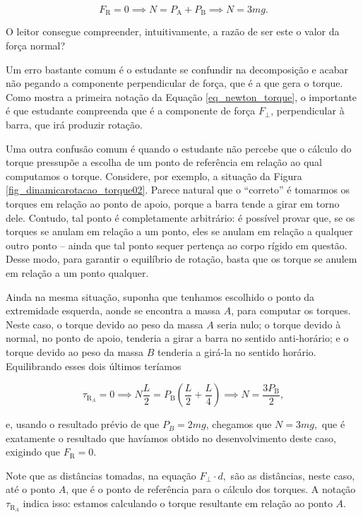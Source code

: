 $$ F_\text{R} = 0 \implies N = P_\text{A} + P_\text{B} \implies N = 3mg.$$

O leitor consegue compreender, intuitivamente, a razão de ser este o valor da força normal?



Um erro bastante comum é o estudante se confundir na decomposição e acabar não pegando a componente perpendicular de força, que é a que gera o torque. Como mostra a primeira notação da Equação \eqref{eq_newton_torque}, o importante é que estudante compreenda que é a componente de força $F_\perp$, perpendicular à barra, que irá produzir rotação.

Uma outra confusão comum é quando o estudante não percebe que o cálculo do torque pressupõe a escolha de um ponto de referência em relação ao qual computamos o torque. Considere, por exemplo, a situação da Figura \ref{fig_dinamicarotacao_torque02}. Parece natural que o ``correto'' é tomarmos os torques em relação ao ponto de apoio, porque a barra tende a girar em torno dele. Contudo, tal ponto é completamente arbitrário: é possível provar que, se os torques se anulam em relação a um ponto, eles se anulam em relação a qualquer outro ponto -- ainda que tal ponto sequer pertença ao corpo rígido em questão. Desse modo, para garantir o equilíbrio de rotação, basta que os torque se anulem em relação a um ponto qualquer.

Ainda na mesma situação, suponha que tenhamos escolhido o ponto da extremidade esquerda, aonde se encontra a massa $A$, para computar os torques. Neste caso, o torque devido ao peso da massa $A$ seria nulo; o torque devido à normal, no ponto de apoio, tenderia a girar a barra no sentido anti-horário; e o torque devido ao peso da massa $B$ tenderia a girá-la no sentido horário. Equilibrando esses dois últimos teríamos

$$ \tau_{\text{R}_{A}} = 0 \implies N \dfrac{L}{2} = P_\text{B} \left(\dfrac{L}{2} + \dfrac{L}{4}  \right)\implies N = \dfrac{3P_\text{B}}{2},$$

\noindent e, usando o resultado prévio de que $P_B=2mg$, chegamos que $N=3mg,$ que é exatamente o resultado que havíamos obtido no desenvolvimento deste caso, exigindo que $F_\text{R}=0.$

Note que as distâncias tomadas, na equação $F_\perp \cdot d,$ são as distâncias, neste caso, até o ponto $A$, que é o ponto de referência para o cálculo dos torques. A notação $\tau_{\text{R}_{A}} $ indica isso: estamos calculando o torque resultante em relação ao ponto $A.$

